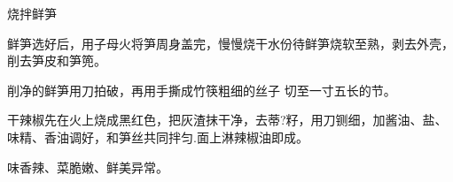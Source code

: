 \begin{recipe}{烧拌鲜笋}

\ingredients


\cooking

\step 鲜笋选好后，用子母火将笋周身盖完，慢慢烧干水份待鲜笋烧软至熟，剥去外壳，削去笋皮和笋篼。

削净的鲜笋用刀拍破，再用手撕成竹筷粗细的丝子 切至一寸五长的节。

\step 干辣椒先在火上烧成黑红色，把灰渣抹干净，去蒂?籽，用刀铡细，加酱油、盐、味精、香油调好，和笋丝共同拌匀.面上淋辣椒油即成。

\notes

味香辣、菜脆嫩、鲜美异常。

\end{recipe}

